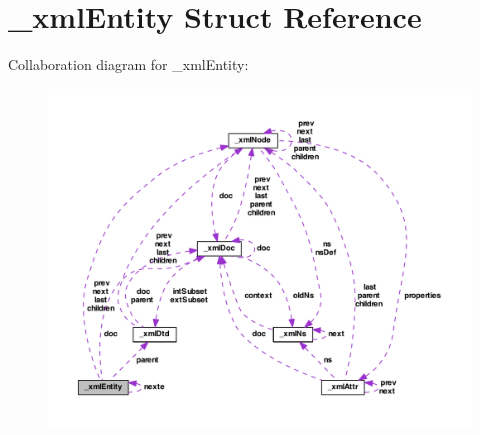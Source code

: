 \hypertarget{struct__xml_entity}{\section{\-\_\-xml\-Entity Struct Reference}
\label{struct__xml_entity}
}


Collaboration diagram for \-\_\-xml\-Entity\-:
\nopagebreak
\begin{figure}[H]
\begin{center}
\leavevmode
\includegraphics[width=350pt]{struct__xml_entity__coll__graph}
\end{center}
\end{figure}
